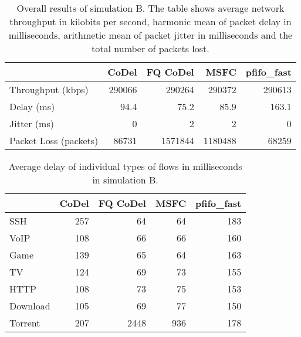 \begin{table}[]
	\centering
	
	\caption{Overall results of simulation B. The table shows average network throughput in kilobits per second, harmonic mean of packet delay in milliseconds, arithmetic mean of packet jitter in milliseconds and the total number of packets lost.}
	\label{tab:results_B}
	\begin{tabular}{@{}lrrrr@{}}
		\toprule
								& CoDel & FQ CoDel & MSFC & pfifo\_fast  \\ \midrule
		Throughput (kbps)       & 290066    & 290264 & 290372   & 290613 \\
		Delay (ms)              & 94.4      & 75.2   & 85.9     & 163.1    \\
		Jitter (ms)             & 0         & 2      & 2        & 0      \\
		Packet Loss (packets)   & 86731     & 1571844& 1180488  & 68259  \\ \bottomrule
	\end{tabular}
\end{table}


\begin{table}
	\caption{Average delay of individual types of flows in milliseconds in simulation B.}
	\label{tab:delay_B}
	\centering
	
	\begin{tabular}{@{}l|rrrr@{}}
		\toprule
						& CoDel & FQ CoDel & MSFC & pfifo\_fast  \\ \midrule
		SSH             &     257       &     64        &     64        &     183       \\
		VoIP            &     108       &     66        &     66        &     160       \\
		Game            &     139       &     65        &     64        &     163       \\
		TV              &     124       &     69        &     73        &     155       \\
		HTTP            &     108       &     73        &     75        &     153       \\
		Download        &     105       &     69        &     77        &     150       \\
		Torrent         &     207       &     2448      &     936      &     178       \\ \bottomrule
	\end{tabular}
\end{table}

